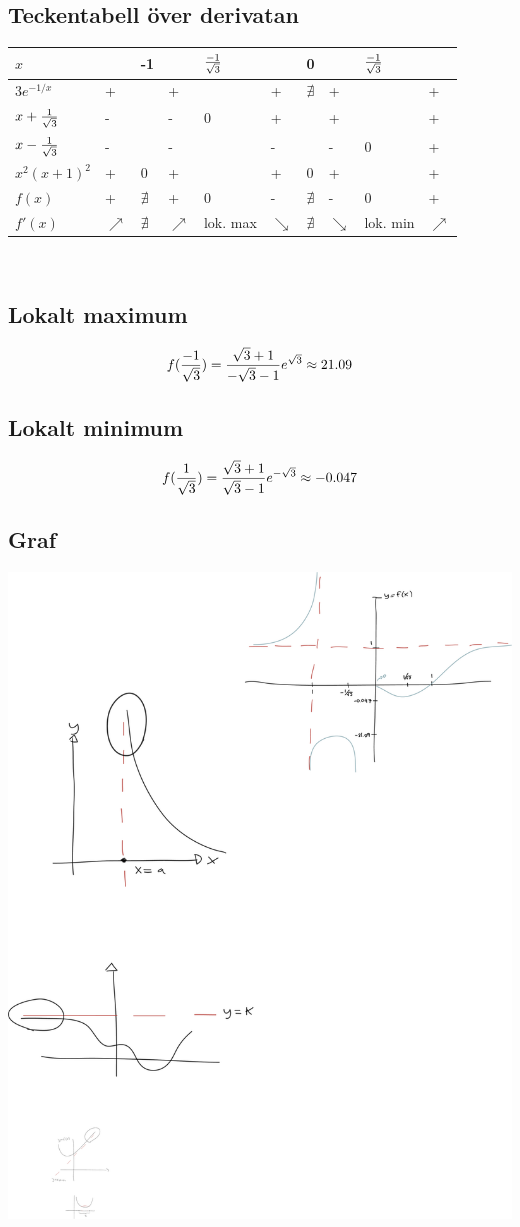 \documentclass{article}
\begin{document}
\subsection{Teckentabell över derivatan}
\begin{tabular}{ l | l l l p{7mm} l l l p{7mm} l }
  $x$               &   & -1&   &$\frac{-1}{\sqrt 3}$&   & 0 &   &$\frac{-1}{\sqrt 3}$&   \\\hline
  $3e^{-1/x}$       & + &   & + &   & + & $\nexists$ & + &   & + \\
  $x+\frac{1}{\sqrt{3}}$& - &   & - & 0 & + &   & + &   & + \\
  $x-\frac{1}{\sqrt{3}}$& - &   & - &   & - &   & - & 0 & + \\
  $x^2(x+1)^2$      & + & 0 & + &   & + & 0 & + &   & + \\\hline
  $f(x)$            & + & $\nexists$ & + & 0 & - & $\nexists$ & - & 0 & + \\
  $f'(x)$           & $\nearrow$ & $\nexists$ & $\nearrow$ & lok. max & $\searrow$  & $\nexists$ & $\searrow$  & lok. min & $\nearrow$
\end{tabular}\\

\subsection{Lokalt maximum}
$$ f(\frac{-1}{\sqrt 3}) = \frac{\sqrt 3 + 1}{-\sqrt 3 - 1} e^{\sqrt 3} \approx 21.09$$

\subsection{Lokalt minimum}
$$ f(\frac{1}{\sqrt 3}) = \frac{\sqrt 3 + 1}{\sqrt 3 - 1} e^{-\sqrt 3} \approx -0.047$$

\subsection{Graf}
\includegraphics[width=\textwidth]{img/graph.pdf}\\
\end{document}
